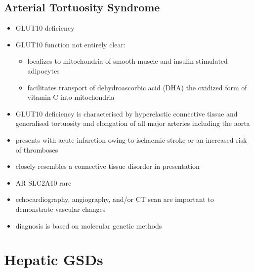 \documentclass{scrartcl}
\begin{document}
\subsection{Arterial Tortuosity Syndrome}
\label{sec:orgcbe1474}
\begin{itemize}
\item GLUT10 deficiency
\item GLUT10 function not entirely clear:
\begin{itemize}
\item localizes to mitochondria of smooth muscle and insulin-stimulated adipocytes
\item facilitates transport of dehydroascorbic acid (DHA) the
oxidized form of vitamin C into mitochondria
\end{itemize}
\item GLUT10 deficiency is characterised by hyperelastic connective tissue
and generalised tortuosity and elongation of all major arteries
including the aorta
\item presents with acute infarction owing to ischaemic stroke or an
increased risk of thromboses
\item closely resembles a connective tissue disorder in presentation
\item AR SLC2A10 rare
\item echocardiography, angiography, and/or CT scan are important to demonstrate vascular changes
\item diagnosis is based on molecular genetic methods
\end{itemize}
\section{Hepatic GSDs}
\label{sec:orgd688f58}
\end{document}
